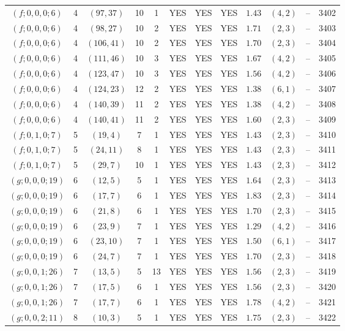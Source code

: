 \begin{longtable}{|c|c|c|c|c|c|c|c|c|c|c|c|}
$(f;0,0,0;6)$ & 4 & $(97,37)$ & 10 & 1 & YES & YES & YES & $1.43$ & $(4,2)$ & -- & 3402\\
$(f;0,0,0;6)$ & 4 & $(98,27)$ & 10 & 2 & YES & YES & YES & $1.71$ & $(2,3)$ & -- & 3403\\
$(f;0,0,0;6)$ & 4 & $(106,41)$ & 10 & 2 & YES & YES & YES & $1.70$ & $(2,3)$ & -- & 3404\\
$(f;0,0,0;6)$ & 4 & $(111,46)$ & 10 & 3 & YES & YES & YES & $1.67$ & $(4,2)$ & -- & 3405\\
$(f;0,0,0;6)$ & 4 & $(123,47)$ & 10 & 3 & YES & YES & YES & $1.56$ & $(4,2)$ & -- & 3406\\
$(f;0,0,0;6)$ & 4 & $(124,23)$ & 12 & 2 & YES & YES & YES & $1.38$ & $(6,1)$ & -- & 3407\\
$(f;0,0,0;6)$ & 4 & $(140,39)$ & 11 & 2 & YES & YES & YES & $1.38$ & $(4,2)$ & -- & 3408\\
$(f;0,0,0;6)$ & 4 & $(140,41)$ & 11 & 2 & YES & YES & YES & $1.60$ & $(2,3)$ & -- & 3409\\
$(f;0,1,0;7)$ & 5 & $(19,4)$ & 7 & 1 & YES & YES & YES & $1.43$ & $(2,3)$ & -- & 3410\\
$(f;0,1,0;7)$ & 5 & $(24,11)$ & 8 & 1 & YES & YES & YES & $1.43$ & $(2,3)$ & -- & 3411\\
$(f;0,1,0;7)$ & 5 & $(29,7)$ & 10 & 1 & YES & YES & YES & $1.43$ & $(2,3)$ & -- & 3412\\
$(g;0,0,0;19)$ & 6 & $(12,5)$ & 5 & 1 & YES & YES & YES & $1.64$ & $(2,3)$ & -- & 3413\\
$(g;0,0,0;19)$ & 6 & $(17,7)$ & 6 & 1 & YES & YES & YES & $1.83$ & $(2,3)$ & -- & 3414\\
$(g;0,0,0;19)$ & 6 & $(21,8)$ & 6 & 1 & YES & YES & YES & $1.70$ & $(2,3)$ & -- & 3415\\
$(g;0,0,0;19)$ & 6 & $(23,9)$ & 7 & 1 & YES & YES & YES & $1.29$ & $(4,2)$ & -- & 3416\\
$(g;0,0,0;19)$ & 6 & $(23,10)$ & 7 & 1 & YES & YES & YES & $1.50$ & $(6,1)$ & -- & 3417\\
$(g;0,0,0;19)$ & 6 & $(24,7)$ & 7 & 1 & YES & YES & YES & $1.70$ & $(2,3)$ & -- & 3418\\
$(g;0,0,1;26)$ & 7 & $(13,5)$ & 5 & 13 & YES & YES & YES & $1.56$ & $(2,3)$ & -- & 3419\\
$(g;0,0,1;26)$ & 7 & $(17,5)$ & 6 & 1 & YES & YES & YES & $1.56$ & $(2,3)$ & -- & 3420\\
$(g;0,0,1;26)$ & 7 & $(17,7)$ & 6 & 1 & YES & YES & YES & $1.78$ & $(4,2)$ & -- & 3421\\
$(g;0,0,2;11)$ & 8 & $(10,3)$ & 5 & 1 & YES & YES & YES & $1.75$ & $(2,3)$ & -- & 3422\\

\end{longtable}
